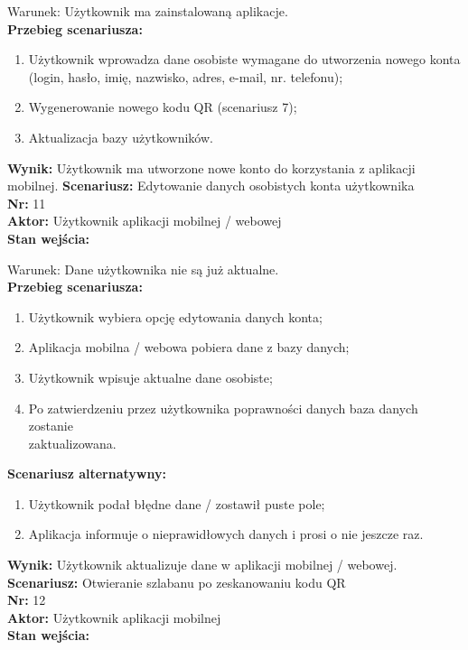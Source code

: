 \documentclass[12pt,a4paper]{article}
\begin{document}
Warunek: Użytkownik ma zainstalowaną aplikacje.
\\{\bf Przebieg scenariusza:}
\begin{enumerate}
\item Użytkownik wprowadza dane osobiste wymagane do utworzenia nowego konta\\(login, hasło, imię, nazwisko, adres, e-mail, nr. telefonu);
\item Wygenerowanie nowego kodu QR (scenariusz 7);
\item Aktualizacja bazy użytkowników.
\end{enumerate}
{\bf Wynik:} Użytkownik ma utworzone nowe konto do korzystania z aplikacji mobilnej.
\newline\newline
{\large \bf Scenariusz:} Edytowanie danych osobistych konta użytkownika
\\{\bf Nr:} 11
\\{\bf Aktor:} Użytkownik aplikacji mobilnej / webowej
\\{\bf Stan wejścia:}

Warunek: Dane użytkownika nie są już aktualne.
\\{\bf Przebieg scenariusza:}
\begin{enumerate}
\item Użytkownik wybiera opcję edytowania danych konta;
\item Aplikacja mobilna / webowa pobiera dane z bazy danych;
\item Użytkownik wpisuje aktualne dane osobiste;
\item Po zatwierdzeniu przez użytkownika poprawności danych baza danych zostanie\\zaktualizowana.
\end{enumerate}
{\bf Scenariusz alternatywny:}
\begin{enumerate}
\item Użytkownik podał błędne dane / zostawił puste pole;
\item Aplikacja informuje o nieprawidłowych danych i prosi o nie jeszcze raz.
\end{enumerate}
{\bf Wynik:} Użytkownik aktualizuje dane w aplikacji mobilnej / webowej.
\newline\newline\newline\newline\newline\newline\newline\newline\newline\newline\newline\newline
{\large \bf Scenariusz:} Otwieranie szlabanu po zeskanowaniu kodu QR
\\{\bf Nr:} 12
\\{\bf Aktor:} Użytkownik aplikacji mobilnej
\\{\bf Stan wejścia:}
\end{document}
